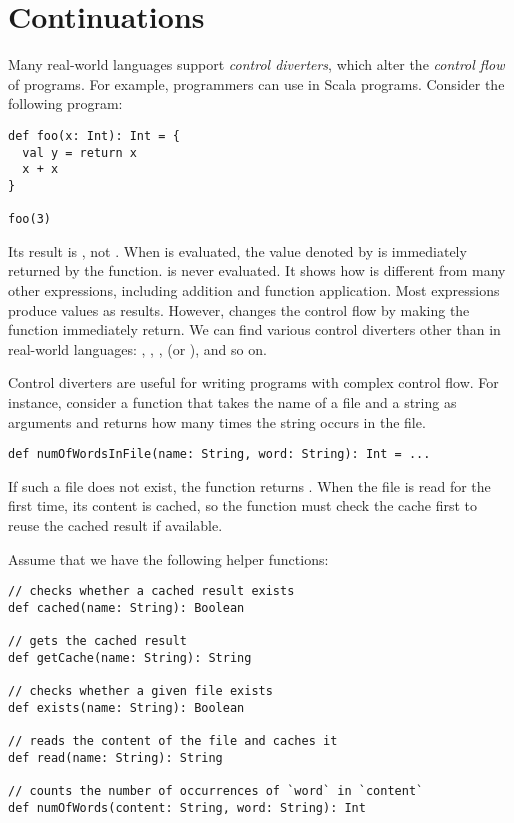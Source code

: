 \setchapterpreamble[u]{\margintoc}
\chapter{Continuations}

\renewcommand{\lang}{\textsf{FAE}\xspace}

Many real-world languages support \textit{control diverters}, which alter the
\textit{control flow} of programs.
For example, programmers can use  in Scala
programs. Consider the following program:

\begin{verbatim}
def foo(x: Int): Int = {
  val y = return x
  x + x
}

foo(3)
\end{verbatim}

Its result is , not . When  is evaluated, the
value denoted by  is immediately returned by the function. 
is never evaluated. It shows how  is different from many other
expressions, including addition and function application. Most expressions
produce values as results. However,  changes
the control flow by making the function immediately return. We can find various
control diverters other than  in real-world languages:
, , ,  (or ), and
so on.

Control diverters are useful for writing programs with complex control flow.
For instance, consider a function  that takes the name of
a file and a string as arguments and returns how many times the string occurs in
the file.

\begin{verbatim}
def numOfWordsInFile(name: String, word: String): Int = ...
\end{verbatim}

If such a file does not exist, the function returns .
When the file is read for the first time, its content is cached, so the function
must check the cache first to reuse the cached result if available.

Assume that we have the following helper functions:

\begin{verbatim}
// checks whether a cached result exists
def cached(name: String): Boolean

// gets the cached result
def getCache(name: String): String

// checks whether a given file exists
def exists(name: String): Boolean

// reads the content of the file and caches it
def read(name: String): String

// counts the number of occurrences of `word` in `content`
def numOfWords(content: String, word: String): Int
\end{verbatim}

